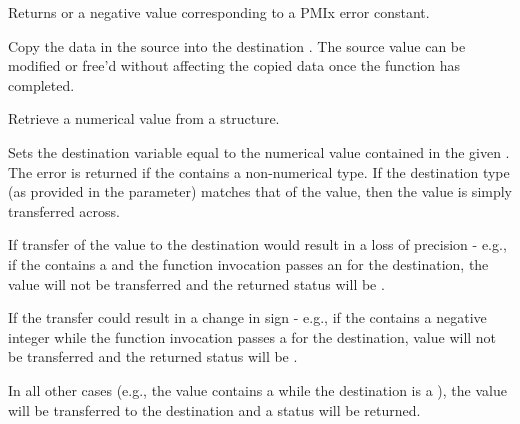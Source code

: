 Returns  or a negative value corresponding to a PMIx error constant.

\descr

Copy the data in the source  into the destination . The source value can be modified or free'd without affecting the copied data once the function has completed.


Retrieve a numerical value from a  structure.


\begin{arglist}
\end{arglist}

Sets the destination variable equal to the numerical value contained in the given .
The  error is returned if the  contains a non-numerical
type. If the destination type (as provided in the  parameter) matches that of the value, then
the value is simply transferred across.

If transfer of the value to the destination would result in a loss of precision - e.g., if the 
contains a  and the function invocation passes an
 for the destination, the value will not be transferred and the returned status will be .

If the transfer could result in a change in sign - e.g., if the  contains a negative
integer while the function invocation passes a  for the destination, value will not be
transferred and the returned status will be .

In all other cases (e.g., the value contains a  while the destination is a ), the value will
be transferred to the destination and a  status will be returned.

